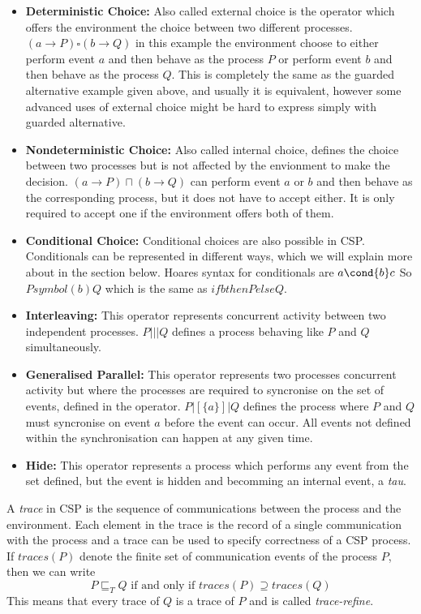 \begin{itemize}
    \item \textbf{Deterministic Choice:} Also called external choice is the operator which offers the environment the choice between two different processes. $(a \rightarrow P) \square (b \rightarrow Q)$ in this example the environment choose to either perform event $a$ and then behave as the process $P$ or perform event $b$ and then behave as the process $Q$. This is completely the same as the guarded alternative example given above, and usually it is equivalent, however some advanced uses of external choice might be hard to express simply with guarded alternative.
    \item \textbf{Nondeterministic Choice:} Also called internal choice, defines the choice between two processes but is not affected by the envionment to make the decision.
    $(a \rightarrow P) \sqcap (b \rightarrow Q)$ can perform event $a$ or $b$ and then behave as the corresponding process, but it does not have to accept either. It is only required to accept one if the environment offers both of them.
    \item \textbf{Conditional Choice:} Conditional choices are also possible in CSP. Conditionals can be represented in different ways, which we will explain more about in the \cspm{} section below. Hoares syntax for conditionals are $a \cond{b} c$ %
    So $ P symbol(b) Q$ which is the same as $if b then P else Q$.
    \item \textbf{Interleaving:} This operator represents concurrent activity between two independent processes. $ P  |||  Q$ defines a process behaving like $P$ and $Q$ simultaneously.
     \item \textbf{Generalised Parallel:} This operator represents two processes concurrent activity but where the processes are required to syncronise on the set of events, defined in the operator. $ P  |[\{ a \}]|  Q$ defines the process where $P$ and $Q$ must syncronise on event $a$ before the event can occur. All events not defined within the synchronisation can happen at any given time.
     \item \textbf{Hide:} This operator represents a process which performs any event from the set defined, but the event is hidden and becomming an internal event, a \textit{tau}.
\end{itemize}

A \textit{trace} in CSP is the sequence of communications between the process and the environment. Each element in the trace is the record of a single communication with the process and a trace can be used to specify correctness of a CSP process. If $traces(P)$ denote the finite set of communication events of the process $P$, then we can write $$ P \sqsubseteq_T Q \text{ if and only if } traces(P) \supseteq traces(Q)$$
This means that every trace of $Q$ is a trace of $P$ and is called \textit{trace-refine}.


